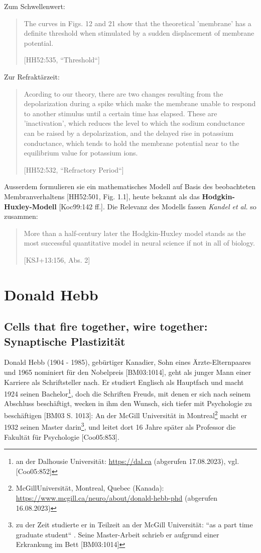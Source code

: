 Zum Schwellenwert:
\blockquote[{[HH52:535, ``Threshold``]}]{
    The curves in Figs. 12 and 21 show that the theoretical 'membrane' has a definite threshold when stimulated by a sudden displacement of membrane potential.
}

Zur Refraktärzeit:
\blockquote[{[HH52:532, ``Refractory Period``]}]{
    Acording to our theory, there are two changes resulting from the depolarization during a spike which make the membrane unable to respond to another stimulus until a certain time has elapsed. These are 'inactivation', which reduces the level to which the sodium conductance can be raised by a depolarization, and the delayed rise in potassium conductance, which tends to hold the membrane potential near to the equilibrium value for potassium ions.
}

Ausserdem formulieren sie ein mathematisches Modell auf Basis des beobachteten Membranverhaltens [HH52:501, Fig. 1.1], heute bekannt als das \textbf{Hodgkin-Huxley-Modell} [Koc99:142 ff.].
 Die Relevanz des Modells fassen \textit{Kandel et al.} so zusammen:

\blockquote[{[KSJ+13:156, Abs. 2]}]{
    More than a half-century later the Hodgkin-Huxley model stands as the most successful quantitative model in neural science if not in all of biology.
}

\section{Donald Hebb}\label{appendix:hebb}
\subsection*{Cells that fire together, wire together: Synaptische Plastizität}

Donald Hebb (1904 - 1985), gebürtiger Kanadier, Sohn eines Ärzte-Elternpaares und 1965 nominiert für den Nobelpreis [BM03:1014], geht als junger Mann einer Karriere als Schriftsteller nach.
Er studiert Englisch als Hauptfach und macht 1924 seinen Bachelor\footnote{
    an der Dalhousie Universität: \url{https://dal.ca} (abgerufen 17.08.2023), vgl. [Coo05:852]
}, doch die Schriften Freuds, mit denen er sich nach seinem Abschluss beschäftigt, wecken in ihm den Wunsch, sich tiefer mit Psychologie zu beschäftigen [BM03 S. 1013]: An der McGill Universität in Montreal\footnote{
    McGillUniversität, Montreal, Quebec (Kanada): \url{https://www.mcgill.ca/neuro/about/donald-hebb-phd} (abgerufen 16.08.2023)
} macht er 1932 seinen Master darin\footnote{
    zu der Zeit studierte er in Teilzeit an der McGill Universität: ``as a part time graduate student`` \cite{[Kle99:1]}. Seine Master-Arbeit schrieb er aufgrund einer Erkrankung im Bett [BM03:1014]
}, und leitet dort 16 Jahre später als Professor die Fakultät für Psychologie [Coo05:853].

